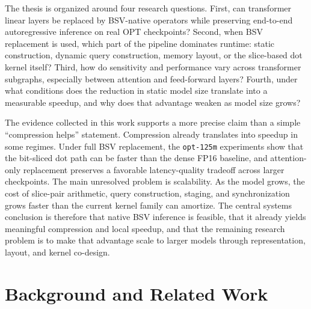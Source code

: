 The thesis is organized around four research questions. First, can transformer linear layers be replaced by BSV-native operators while preserving end-to-end autoregressive inference on real OPT checkpoints? Second, when BSV replacement is used, which part of the pipeline dominates runtime: static construction, dynamic query construction, memory layout, or the slice-based dot kernel itself? Third, how do sensitivity and performance vary across transformer subgraphs, especially between attention and feed-forward layers? Fourth, under what conditions does the reduction in static model size translate into a measurable speedup, and why does that advantage weaken as model size grows?

The evidence collected in this work supports a more precise claim than a simple ``compression helps'' statement. Compression already translates into speedup in some regimes. Under full BSV replacement, the \texttt{opt-125m} experiments show that the bit-sliced dot path can be faster than the dense FP16 baseline, and attention-only replacement preserves a favorable latency-quality tradeoff across larger checkpoints. The main unresolved problem is scalability. As the model grows, the cost of slice-pair arithmetic, query construction, staging, and synchronization grows faster than the current kernel family can amortize. The central systems conclusion is therefore that native BSV inference is feasible, that it already yields meaningful compression and local speedup, and that the remaining research problem is to make that advantage scale to larger models through representation, layout, and kernel co-design.

\section{Background and Related Work}\label{sec:background}
